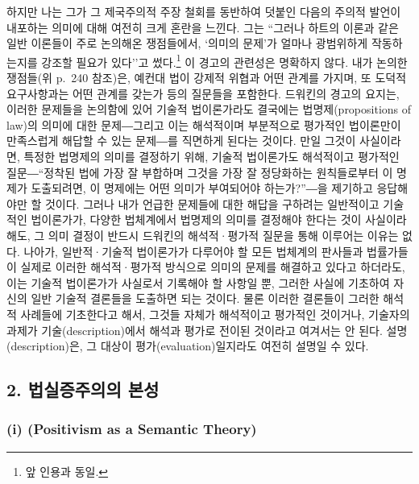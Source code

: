 하지만 나는 그가 그 제국주의적 주장 철회를 동반하여 덧붙인 다음의 주의적
발언이 내포하는 의미에 대해 여전히 크게 혼란을 느낀다. 그는 ``그러나
하트의 이론과 같은 일반 이론들이 주로 논의해온 쟁점들에서, `의미의
문제'가 얼마나 광범위하게 작동하는지를 강조할 필요가 있다''고
썼다.\footnote{앞 인용과 동일.} 이 경고의 관련성은 명확하지 않다. 내가
논의한 쟁점들(위 p.~240 참조)은, 예컨대 법이 강제적 위협과 어떤 관계를
가지며, 또 도덕적 요구사항과는 어떤 관계를 갖는가 등의 질문들을
포함한다. 드워킨의 경고의 요지는, 이러한 문제들을 논의함에 있어 기술적
법이론가라도 결국에는 법명제(propositions of law)의 의미에 대한
문제―그리고 이는 해석적이며 부분적으로 평가적인 법이론만이 만족스럽게
해답할 수 있는 문제―를 직면하게 된다는 것이다. 만일 그것이 사실이라면,
특정한 법명제의 의미를 결정하기 위해, 기술적 법이론가도 해석적이고
평가적인 질문―``정착된 법에 가장 잘 부합하며 그것을 가장 잘 정당화하는
원칙들로부터 이 명제가 도출되려면, 이 명제에는 어떤 의미가 부여되어야
하는가?''―을 제기하고 응답해야만 할 것이다. 그러나 내가 언급한 문제들에
대한 해답을 구하려는 일반적이고 기술적인 법이론가가, 다양한 법체계에서
법명제의 의미를 결정해야 한다는 것이 사실이라 해도, 그 의미 결정이
반드시 드워킨의 해석적·평가적 질문을 통해 이루어는
이유는 없다. 나아가, 일반적·기술적 법이론가가 다루어야 할 모든 법체계의
판사들과 법률가들이 실제로 이러한 해석적·평가적 방식으로 의미의 문제를
해결하고 있다고 하더라도, 이는 기술적 법이론가가 사실로서 기록해야 할
사항일 뿐, 그러한 사실에 기초하여 자신의 일반 기술적 결론들을 도출하면
되는 것이다. 물론 이러한 결론들이 그러한 해석적 사례들에 기초한다고
해서, 그것들 자체가 해석적이고 평가적인 것이거나, 기술자의 과제가
기술(description)에서 해석과 평가로 전이된 것이라고 여겨서는 안 된다.
설명(description)은, 그 대상이 평가(evaluation)일지라도 여전히 설명일 수
있다.

\subsection{2. 법실증주의의
본성}\label{uxbc95uxc2e4uxc99duxc8fcuxc758uxc758-uxbcf8uxc131}

\subsubsection{\texorpdfstring{(i) (Positivism as a Semantic
Theory)}{(i) 의미론적 이론으로서의 실증주의(Positivism as a Semantic Theory)}}\label{i-uxc758uxbbf8uxb860uxc801-uxc774uxb860uxc73cuxb85cuxc11cuxc758-uxc2e4uxc99duxc8fcuxc758positivism-as-a-semantic-theory}

